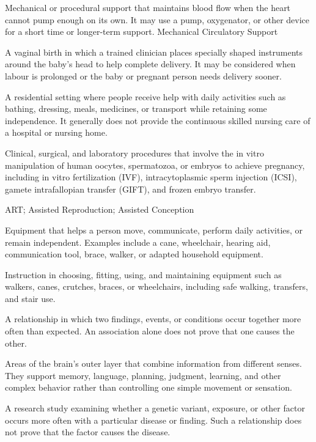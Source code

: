  Mechanical or procedural support that maintains blood flow when the heart cannot pump enough on its own. It may use a pump, oxygenator, or other device for a short time or longer-term support.
\synonyms
Mechanical Circulatory Support

 A vaginal birth in which a trained clinician places specially shaped instruments around the baby’s head to help complete delivery. It may be considered when labour is prolonged or the baby or pregnant person needs delivery sooner.

 A residential setting where people receive help with daily activities such as bathing, dressing, meals, medicines, or transport while retaining some independence. It generally does not provide the continuous skilled nursing care of a hospital or nursing home.

 Clinical, surgical, and laboratory procedures that involve the in vitro manipulation of human oocytes, spermatozoa, or embryos to achieve pregnancy, including in vitro fertilization (IVF), intracytoplasmic sperm injection (ICSI), gamete intrafallopian transfer (GIFT), and frozen embryo transfer.

\synonyms
ART; Assisted Reproduction; Assisted Conception

 Equipment that helps a person move, communicate, perform daily activities, or remain independent. Examples include a cane, wheelchair, hearing aid, communication tool, brace, walker, or adapted household equipment.

 Instruction in choosing, fitting, using, and maintaining equipment such as walkers, canes, crutches, braces, or wheelchairs, including safe walking, transfers, and stair use.

 A relationship in which two findings, events, or conditions occur together more often than expected. An association alone does not prove that one causes the other.

 Areas of the brain’s outer layer that combine information from different senses. They support memory, language, planning, judgment, learning, and other complex behavior rather than controlling one simple movement or sensation.

 A research study examining whether a genetic variant, exposure, or other factor occurs more often with a particular disease or finding. Such a relationship does not prove that the factor causes the disease.


